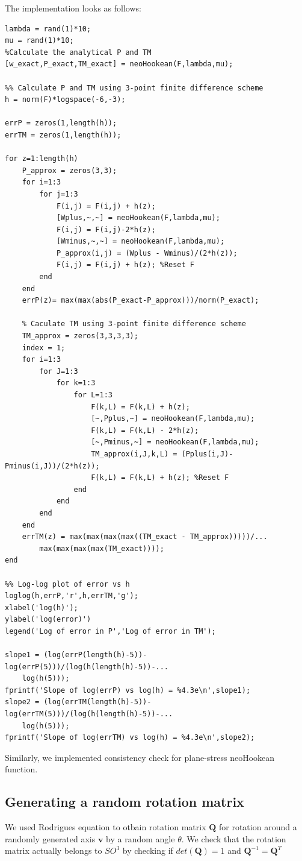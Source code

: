 \documentclass[../main.tex]{subfiles}
\begin{document}
The implementation looks as follows:
\begin{lstlisting}[style=Matlab-editor]
lambda = rand(1)*10;
mu = rand(1)*10;
%Calculate the analytical P and TM
[w_exact,P_exact,TM_exact] = neoHookean(F,lambda,mu);

%% Calculate P and TM using 3-point finite difference scheme
h = norm(F)*logspace(-6,-3);

errP = zeros(1,length(h));
errTM = zeros(1,length(h));

for z=1:length(h)
    P_approx = zeros(3,3);
    for i=1:3
        for j=1:3
            F(i,j) = F(i,j) + h(z);
            [Wplus,~,~] = neoHookean(F,lambda,mu);
            F(i,j) = F(i,j)-2*h(z);
            [Wminus,~,~] = neoHookean(F,lambda,mu);
            P_approx(i,j) = (Wplus - Wminus)/(2*h(z));
            F(i,j) = F(i,j) + h(z); %Reset F
        end
    end
    errP(z)= max(max(abs(P_exact-P_approx)))/norm(P_exact);
    
    % Caculate TM using 3-point finite difference scheme
    TM_approx = zeros(3,3,3,3);
    index = 1;
    for i=1:3
        for J=1:3
            for k=1:3
                for L=1:3
                    F(k,L) = F(k,L) + h(z);
                    [~,Pplus,~] = neoHookean(F,lambda,mu);
                    F(k,L) = F(k,L) - 2*h(z);
                    [~,Pminus,~] = neoHookean(F,lambda,mu);
                    TM_approx(i,J,k,L) = (Pplus(i,J)-Pminus(i,J))/(2*h(z));
                    F(k,L) = F(k,L) + h(z); %Reset F
                end
            end
        end
    end
    errTM(z) = max(max(max(max((TM_exact - TM_approx)))))/...
        max(max(max(max(TM_exact))));
end

%% Log-log plot of error vs h
loglog(h,errP,'r',h,errTM,'g');
xlabel('log(h)');
ylabel('log(error)')
legend('Log of error in P','Log of error in TM');

slope1 = (log(errP(length(h)-5))-log(errP(5)))/(log(h(length(h)-5))-...
    log(h(5)));
fprintf('Slope of log(errP) vs log(h) = %4.3e\n',slope1);
slope2 = (log(errTM(length(h)-5))-log(errTM(5)))/(log(h(length(h)-5))-...
    log(h(5)));
fprintf('Slope of log(errTM) vs log(h) = %4.3e\n',slope2);
\end{lstlisting}

Similarly, we implemented consistency check for plane-stress
neoHookean function.

\subsection{Generating a random rotation matrix}
We used Rodrigues equation to otbain rotation matrix $\mathbf{Q}$ for
rotation around a randomly generated axis $\mathbf{v}$ by a random
angle $\theta$. We check that the rotation matrix actually belongs to
$SO^3$ by checking if $det(\mathbf{Q}) = 1$ and
$\mathbf{Q}^{-1} =\mathbf{Q}^T $
\end{document}
